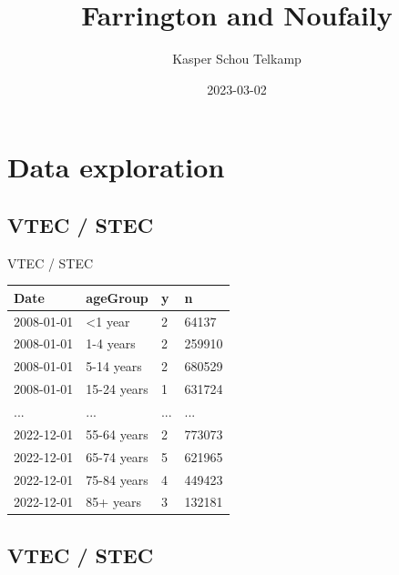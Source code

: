 \documentclass[aspectratio=169]{beamer}
\title[Automated and Early Detection of Disease Outbreaks]{Farrington
and Noufaily}
\author{Kasper Schou Telkamp}
\institute{Section for Dynamical Systems}
\date{2023-03-02}
\begin{document}
\frame{
	\maketitle
}


\hypertarget{data-exploration}{%
\section{Data exploration}\label{data-exploration}}

\hypertarget{vtec-stec}{%
\subsection*{VTEC / STEC}\label{vtec-stec}}

\begin{frame}{VTEC / STEC}
\tiny

\begin{table}
\centering\begingroup\fontsize{12}{14}\selectfont

\begin{tabular}{llll}
\toprule
Date & ageGroup & y & n\\
\midrule
2008-01-01 & <1 year & 2 & 64137\\
2008-01-01 & 1-4 years & 2 & 259910\\
2008-01-01 & 5-14 years & 2 & 680529\\
2008-01-01 & 15-24 years & 1 & 631724\\
... & ... & ... & ...\\
2022-12-01 & 55-64 years & 2 & 773073\\
2022-12-01 & 65-74 years & 5 & 621965\\
2022-12-01 & 75-84 years & 4 & 449423\\
2022-12-01 & 85+ years & 3 & 132181\\
\bottomrule
\end{tabular}
\endgroup{}
\end{table}

\normalsize
\end{frame}

\hypertarget{vtec-stec-1}{%
\subsection{VTEC / STEC}\label{vtec-stec-1}}
\end{document}
